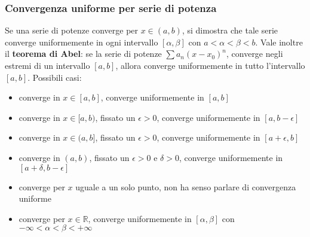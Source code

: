 \subsubsection{Convergenza uniforme per serie di potenza}
Se una serie di potenze converge per $x \in (a,b)$, si dimostra che tale serie converge uniformemente in ogni intervallo $[\alpha, \beta]$ con $a < \alpha< \beta < b$.\newline
\newline
Vale inoltre il \textbf{teorema di Abel}: se la serie di potenze $\sum a_n (x-x_0)^n$, converge negli estremi di un intervallo $[a,b]$, allora converge uniformemente in tutto l'intervallo $[a,b]$.\newline
\newline
Possibili casi:
\begin{itemize}
    \item converge in $x \in[a,b]$, converge uniformemente in $[a, b]$
    \item converge in $x \in[a,b)$, fissato un $\epsilon > 0$, converge uniformemente in $[a, b-\epsilon]$
    \item converge in $x \in(a,b]$, fissato un $\epsilon > 0$, converge uniformemente in $[a + \epsilon, b]$
    \item converge in $(a,b)$, fissato un $\epsilon > 0$ e $\delta > 0$, converge uniformemente in $[a + \delta, b-\epsilon]$
    \item converge per $x$ uguale a un solo punto, non ha senso parlare di convergenza uniforme
    \item converge per $x \in\mathbb{R}$, converge uniformemente in $[\alpha, \beta]$ con $-\infty < \alpha < \beta < + \infty$
\end{itemize}
